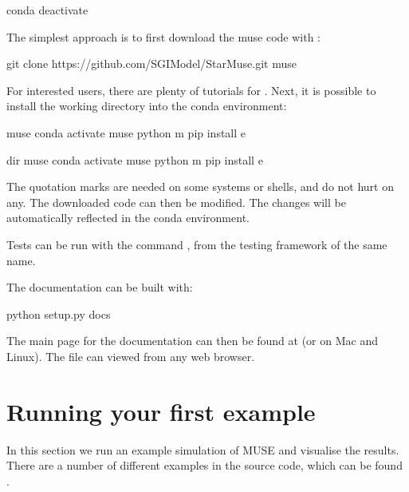 \documentclass[letterpaper,10pt,english]{sphinxmanual}
\begin{document}
\begin{sphinxVerbatim}[commandchars=\\\{\}]
conda deactivate
\end{sphinxVerbatim}

The simplest approach is to first download the muse code with :

\begin{sphinxVerbatim}[commandchars=\\\{\}]
git clone https://github.com/SGIModel/StarMuse.git muse
\end{sphinxVerbatim}

For interested users, there are plenty of  tutorials for .
Next, it is possible to install the working directory into the conda environment:

\begin{sphinxVerbatim}[commandchars=\\\{\}]
 muse
conda activate muse
python \PYGZhy{}m pip install \PYGZhy{}e 

dir muse
conda activate muse
python \PYGZhy{}m pip install \PYGZhy{}e 
\end{sphinxVerbatim}

The quotation marks are needed on some systems or shells, and do not hurt on any. The
downloaded code can then be modified. The changes will be automatically reflected in the
conda environment.

Tests can be run with the command , from the testing framework of the same name.

The documentation can be built with:

\begin{sphinxVerbatim}[commandchars=\\\{\}]
python setup.py docs
\end{sphinxVerbatim}

The main page for the documentation can then be found at
 (or  on Mac and Linux).
The file can viewed from any web browser.


\chapter{Running your first example}
\label{\detokenize{running-muse-example:Running-your-first-example}}\label{\detokenize{running-muse-example::doc}}
In this section we run an example simulation of MUSE and visualise the results. There are a number of different examples in the source code, which can be found .
\end{document}
